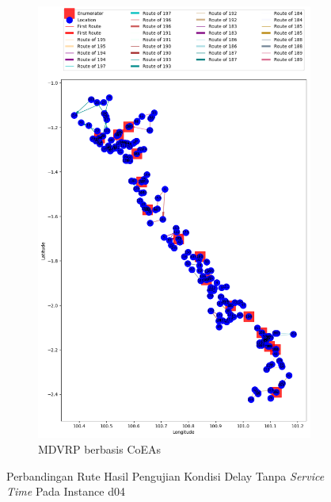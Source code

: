 \begin{figure}[H]
	\centering
	\begin{subfigure}[t]{\textwidth}
		\centering
		\includegraphics[width=\textwidth]{Resources/Images/delayed_5/real_m15_n100_delayed_5_coes}
		\caption{MDVRP berbasis CoEAs}
		\label{fig:real_m15_n100_delayed_5_coes}
	\end{subfigure}
	\caption{Perbandingan Rute Hasil Pengujian Kondisi Delay Tanpa \textit{Service Time} Pada Instance d04}
	\label{fig:real_m15_n100_delayed_5}
\end{figure}


